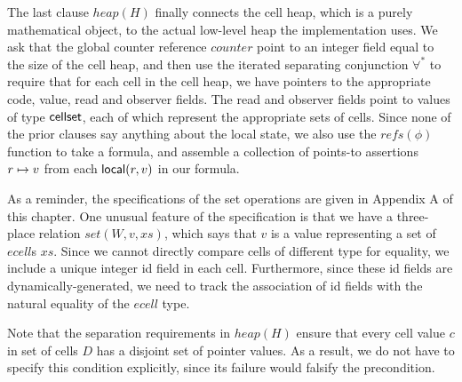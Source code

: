 The last clause $heap(H)$ finally connects the cell heap, which is a
purely mathematical object, to the actual low-level heap the
implementation uses. We ask that the global counter reference
$counter$ point to an integer field equal to the size of the cell
heap, and then use the iterated separating conjunction $\forall^*$ to
require that for each cell in the cell heap, we have pointers to the
appropriate code, value, read and observer fields. The read and
observer fields point to values of type $\mathsf{cellset}$, each of which
represent the appropriate sets of cells.  Since none of the prior
clauses say anything about the local state, we also use the
$\mathit{refs}(\phi)$ function to take a formula, and assemble a
collection of points-to assertions $r \mapsto v$ from each
$\mathsf{local}({r}, {v})$ in our formula. 

As a reminder, the specifications of the set operations are given in
Appendix A of this chapter. One unusual feature of the specification
is that we have a three-place relation $\mathit{set}(W, v, xs)$, which
says that $v$ is a value representing a set of $\mathit{ecell}$s $xs$.
Since we cannot directly compare cells of different type for equality,
we include a unique integer id field in each cell. Furthermore, since
these id fields are dynamically-generated, we need to track the
association of id fields with the natural equality of the
$\mathit{ecell}$ type.

Note that the separation requirements in $\mathit{heap}(H)$ ensure
that every cell value $c$ in set of cells $D$ has a disjoint set of
pointer values. As a result, we do not have to specify this condition
explicitly, since its failure would falsify the precondition.

